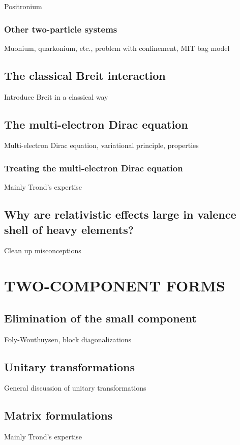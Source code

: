 \documentclass[12pt]{article}
\begin{document}
Positronium

\subsubsection{\sffamily Other two-particle systems}
Muonium, quarkonium, etc., problem with confinement, MIT bag model

\subsection{\sffamily The classical Breit interaction}
Introduce Breit in a classical way

\subsection{\label{ME-Dirac} \sffamily The multi-electron Dirac equation}
Multi-electron Dirac equation, variational principle, properties

\subsubsection{\sffamily Treating the multi-electron Dirac equation}
Mainly Trond's expertise

\subsection{\label{RelVal}\sffamily Why are relativistic effects large in valence shell of heavy elements?}
Clean up misconceptions

\section{\label{TwoComp} \sffamily \Large TWO-COMPONENT FORMS}

\subsection{\sffamily Elimination of the small component}
Foly-Wouthuysen, block diagonalizations

\subsection{\sffamily Unitary transformations}
General discussion of unitary transformations

\subsection{\sffamily Matrix formulations}
Mainly Trond's expertise
\end{document}

